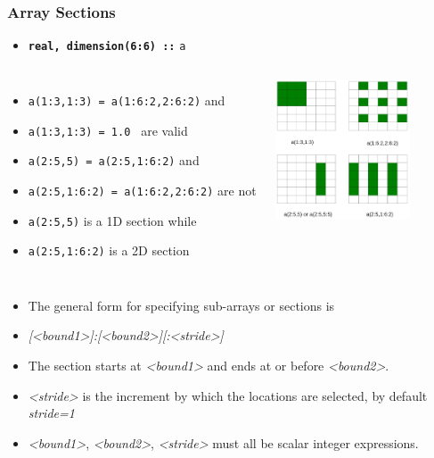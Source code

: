 \documentclass[slidestop,mathserif,compress,xcolor=svgnames]{beamer}
\begin{document}
\begin{frame}[allowframebreaks]
  \frametitle{\small Array Sections}
  \begin{itemize}
    \item[] \textbf{\texttt{real, dimension(6:6) ::}} \texttt{a}
  \end{itemize}
  \begin{columns}
    \column{7cm}
    \begin{itemize}
      \item {\texttt{a(1:3,1:3) = a(1:6:2,2:6:2)}} and
      \item[] {\texttt{a(1:3,1:3) = 1.0 }} are valid
      \item {\texttt{a(2:5,5) = a(2:5,1:6:2)}} and
      \item[] {\texttt{a(2:5,1:6:2) = a(1:6:2,2:6:2)}} are not
      \item {\texttt{a(2:5,5)}} is a 1D section while 
      \item[] {\texttt{a(2:5,1:6:2)}} is a 2D section
    \end{itemize}
    \column{4cm}
    \vspace{-0.5cm}
    \begin{center}
      \includegraphics[width=4cm,clip=true]{./array6}
    \end{center}
  \end{columns}

  \begin{itemize}
    \item The general form for specifying sub-arrays or sections is
    \item[] \textit{[<bound1>]:[<bound2>][:<stride>]}
    \item The section starts at \textit{<bound1>} and ends at or before \textit{<bound2>}.
    \item \textit{<stride>} is the increment by which the locations are selected, by default \textit{stride=1}
    \item \textit{<bound1>}, \textit{<bound2>}, \textit{<stride>} must all be scalar integer expressions.
  \end{itemize}


\end{frame}
\end{document}
